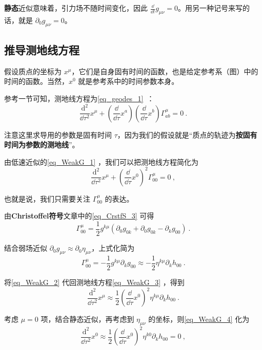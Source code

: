 \textbf{静态}近似意味着，引力场不随时间变化，因此 $\frac{\dd}{\dd t}g_{\mu\nu}=0$。用另一种记号来写的话，就是 $\partial_0g_{\mu\nu}=0$。

\subsection{推导测地线方程}

假设质点的坐标为 $x^\mu$，它们是自身固有时间的函数，也是给定参考系（图）中的时间的函数。当然，$x^0$ 就是参考系中的时间参数本身。

参考一节可知，测地线方程为\autoref{eq_geodes_1}~：
\begin{equation}
\frac{\mathrm{d}^2}{\dd\tau^2}x^\mu+(\frac{\dd}{\dd\tau}x^a)(\frac{\dd}{\dd\tau}x^b)\Gamma^\mu_{ab}=0~.
\end{equation}

注意这里求导用的参数是固有时间 $\tau$，因为我们的假设就是“质点的轨迹为\textbf{按固有时间为参数的测地线}”。

由低速近似的\autoref{eq_WeakG_1} ，我们可以把测地线方程简化为
\begin{equation}\label{eq_WeakG_3}
\frac{\mathrm{d}^2}{\dd\tau^2}x^\mu+(\frac{\dd}{\dd\tau}x^0)^2\Gamma^\mu_{00}=0~,
\end{equation}

也就是说，我们只需要关注 $\Gamma^\mu_{00}$ 的表达。

由\textbf{Christoffel符号}文章中的\autoref{eq_CrstfS_3} 可得
\begin{equation}
\Gamma^\mu_{00}=\frac{1}{2}g^{k\mu}(\partial_0g_{0k}+\partial_0g_{0k}-\partial_{k}g_{00})~.
\end{equation}

结合弱场近似 $\partial_0g_{\mu\nu}\approx\partial_0\eta_{\mu\nu}$，上式化简为
\begin{equation}\label{eq_WeakG_2}
\Gamma^\mu_{00}=-\frac{1}{2}g^{k\mu}\partial_{k}g_{00}\approx-\frac{1}{2}\eta^{k\mu}\partial_{k}h_{00}~.
\end{equation}

将\autoref{eq_WeakG_2} 代回测地线方程\autoref{eq_WeakG_3} ，得到
\begin{equation}\label{eq_WeakG_4}
\frac{\mathrm{d}^2}{\dd\tau^2}x^\mu\approx\frac{1}{2}(\frac{\dd}{\dd\tau}x^0)^2\eta^{k\mu}\partial_{k}h_{00}~.
\end{equation}

考虑 $\mu=0$ 项，结合静态近似，再考虑到 $\eta_{\mu\nu}$ 的坐标，则\autoref{eq_WeakG_4} 化为
\begin{equation}
\frac{\mathrm{d}^2}{\dd\tau^2}x^0\approx\frac{1}{2}(\frac{\dd}{\dd\tau}x^0)^2\eta^{k0}\partial_{k}h_{00}=0~,
\end{equation}

